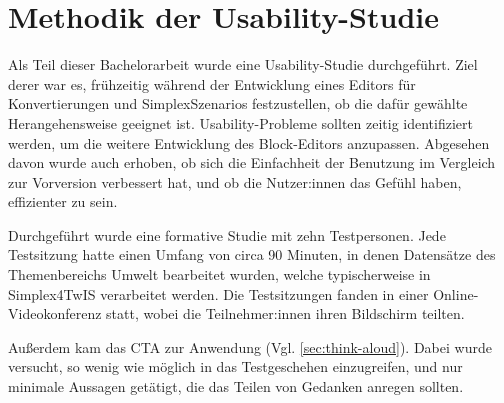 \section{Methodik der Usability-Studie}
\label{sec:study-methods}

Als Teil dieser Bachelorarbeit wurde eine Usability-Studie durchgeführt. Ziel derer war es, frühzeitig während der Entwicklung eines Editors für Konvertierungen und SimplexSzenarios festzustellen, ob die dafür gewählte Herangehensweise geeignet ist. Usability-Probleme sollten zeitig identifiziert werden, um die weitere Entwicklung des Block-Editors anzupassen. Abgesehen davon wurde auch erhoben, ob sich die Einfachheit der Benutzung im Vergleich zur Vorversion verbessert hat, und ob die Nutzer:innen das Gefühl haben, effizienter zu sein.

Durchgeführt wurde eine formative Studie mit zehn Testpersonen. Jede Testsitzung hatte einen Umfang von circa 90 Minuten, in denen Datensätze des Themenbereichs Umwelt bearbeitet wurden, welche typischerweise in Simplex4TwIS verarbeitet werden. Die Testsitzungen fanden in einer Online-Videokonferenz statt, wobei die Teilnehmer:innen ihren Bildschirm teilten.

Außerdem kam das \acf{CTA} zur Anwendung (Vgl. \ref{sec:think-aloud}). Dabei wurde versucht, so wenig wie möglich in das Testgeschehen einzugreifen, und nur minimale Aussagen getätigt, die das Teilen von Gedanken anregen sollten.
